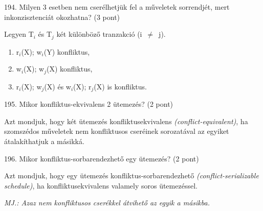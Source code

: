 \documentclass[a4paper,11.5pt, table]{article}
\begin{document}
194. Milyen 3 esetben nem cserélhetjük fel a műveletek sorrendjét, mert inkonzisztenciát okozhatna? (3 pont)
\begin{compactitem}
	\item Legyen T$_{i}$ és T$_{j}$ két különböző tranzakció (i $\not=$ j).
	\begin{enumerate}[label= \alph*)]
		\item r$_{i}$(X); w$_{i}$(Y) konfliktus,
		
		\item w$_{i}$(X); w$_{j}$(X) konfliktus, 
		
		\item r$ _{i} $(X); w$ _{j} $(X) és w$ _{i} $(X); r$ _{j} $(X) is konfliktus. 
	\end{enumerate}
\end{compactitem}

195. Mikor konfliktus-ekvivalens 2 ütemezés? (2 pont)
	\begin{compactitem}
		\item Azt mondjuk, hogy két ütemezés konfliktusekvivalens \textit{(conflict-equivalent)}, ha szomszédos műveletek nem konfliktusos cseréinek sorozatával az egyiket átalakíthatjuk a másikká. 
	\end{compactitem}

196. Mikor konfliktus-sorbarendezhető egy ütemezés? (2 pont)
	\begin{compactitem}
		\item Azt mondjuk, hogy egy ütemezés konfliktus-sorbarendezhető \textit{(conflict-serializable schedule)}, ha konfliktusekvivalens valamely soros ütemezéssel. 
		\item \textit{MJ.: Azaz nem konfliktusos cserékkel átvihető az egyik a másikba.}
	\end{compactitem}
\end{document}
